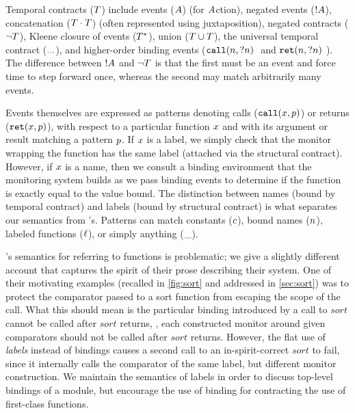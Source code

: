 \documentclass[preprint,onecolumn,9pt]{sigplanconf} %
\begin{document}
Temporal contracts ($T$) include events ($A$) (for $A$ction), negated events ($! A$), concatenation ($T \cdot T$) (often represented using juxtaposition), negated contracts ($\neg T$), Kleene closure of events ($T^*$), union ($T \cup T$), the universal temporal contract (${\tt ...}$), and higher-order binding events ($\stcall{\mname}{\mname}$ and $\stret{\mname}{\mname}$).
%
The difference between $! A$ and $\neg T$ is that the first must be an event and force time to step forward once, whereas the second may match arbitrarily many events.

Events themselves are expressed as patterns denoting calls (${\tt call}(x, p)$) or returns (${\tt ret}(x, p)$), with respect to a particular function $x$ and with its argument or result matching a pattern $p$.
%
If $x$ is a label, we simply check that the monitor wrapping the function has the same label (attached via the structural contract).
%
However, if $x$ is a name, then we consult a binding environment that the monitoring system builds as we pass binding events to determine if the function is exactly equal to the value bound.
%
The distinction between names (bound by temporal contract) and labels (bound by structural contract) is what separates our semantics from \citeauthor{ianjohnson:dfm:icfp2011}'s.
%
Patterns can match constants ($c$), bound names ($n$), labeled functions ($\ell$), or simply anything ($\_$).

\citeauthor{ianjohnson:dfm:icfp2011}'s semantics for referring to functions is problematic; we give a slightly different account that captures the spirit of their prose describing their system.
%
One of their motivating examples (recalled in \autoref{fig:sort} and addressed in \autoref{sec:sort}) was to protect the comparator passed to a sort function from escaping the scope of the call.
%
What this should mean is the particular binding introduced by a call to $sort$ cannot be called after $sort$ returns, \ie, each constructed monitor around given comparators should not be called after $sort$ returns.
%
However, the flat use of \emph{labels} instead of bindings causes a second call to an in-spirit-correct $sort$ to fail, since it internally calls the comparator of the same label, but different monitor construction.
%
We maintain the semantics of labels in order to discuss top-level bindings of a module, but encourage the use of binding for contracting the use of first-class functions.
\end{document}
